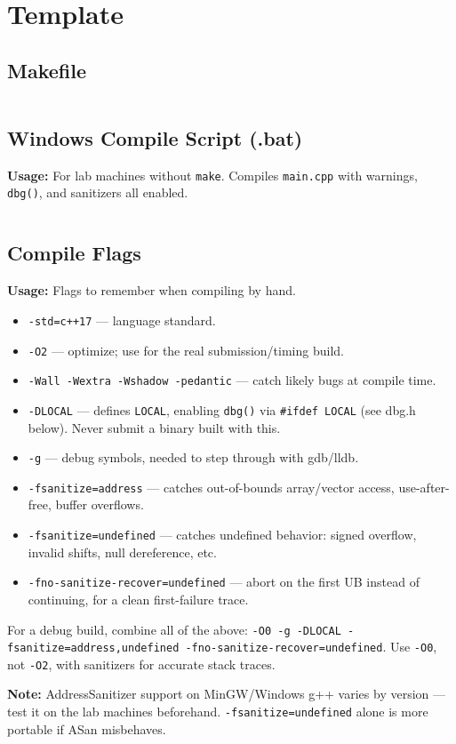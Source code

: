 \section{Template}
  \subsection{Makefile}
    \inputminted{bash}{library/template/Makefile}
  \subsection{Windows Compile Script (.bat)}
    \par \textbf{Usage:} For lab machines without \texttt{make}. Compiles \texttt{main.cpp} with warnings, \texttt{dbg()}, and sanitizers all enabled.
    \inputminted{bat}{library/template/compile.bat}
  \subsection{Compile Flags}
    \par \textbf{Usage:} Flags to remember when compiling by hand.
    \begin{itemize}
        \item \texttt{-std=c++17} --- language standard.
        \item \texttt{-O2} --- optimize; use for the real submission/timing build.
        \item \texttt{-Wall -Wextra -Wshadow -pedantic} --- catch likely bugs at compile time.
        \item \texttt{-DLOCAL} --- defines \texttt{LOCAL}, enabling \texttt{dbg()} via \texttt{\#ifdef LOCAL} (see dbg.h below). Never submit a binary built with this.
        \item \texttt{-g} --- debug symbols, needed to step through with gdb/lldb.
        \item \texttt{-fsanitize=address} --- catches out-of-bounds array/vector access, use-after-free, buffer overflows.
        \item \texttt{-fsanitize=undefined} --- catches undefined behavior: signed overflow, invalid shifts, null dereference, etc.
        \item \texttt{-fno-sanitize-recover=undefined} --- abort on the first UB instead of continuing, for a clean first-failure trace.
    \end{itemize}
    For a debug build, combine all of the above: \texttt{-O0 -g -DLOCAL -fsanitize=address,undefined -fno-sanitize-recover=undefined}. Use \texttt{-O0}, not \texttt{-O2}, with sanitizers for accurate stack traces. \\
    \par \textbf{Note:} AddressSanitizer support on MinGW/Windows g++ varies by version --- test it on the lab machines beforehand. \texttt{-fsanitize=undefined} alone is more portable if ASan misbehaves.
